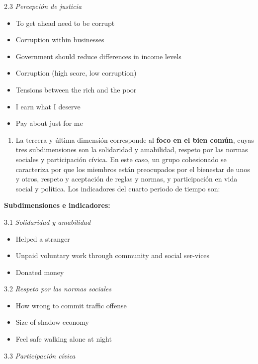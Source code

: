 \documentclass[
  12pt,
]{book}
\providecommand{\tightlist}{%
  \setlength{\itemsep}{0pt}\setlength{\parskip}{0pt}}
\begin{document}
2.3 \emph{Percepción de justicia}

\begin{itemize}
\tightlist
\item
  To get ahead need to be corrupt
\item
  Corruption within businesses
\item
  Government should reduce differences in income levels
\item
  Corruption (high score, low corruption)
\item
  Tensions between the rich and the poor
\item
  I earn what I deserve
\item
  Pay about just for me
\end{itemize}

\begin{enumerate}
\def\labelenumi{\arabic{enumi}.}
\setcounter{enumi}{2}
\tightlist
\item
  La tercera y última dimensión corresponde al \textbf{foco en el bien común}, cuyas tres subdimensiones son la solidaridad y amabilidad, respeto por las normas sociales y participación cívica. En este caso, un grupo cohesionado se caracteriza por que los miembros están preocupados por el bienestar de unos y otros, respeto y aceptación de reglas y normas, y participación en vida social y política. Los indicadores del cuarto periodo de tiempo son:
\end{enumerate}

\textbf{Subdimensiones e indicadores:}

3.1 \emph{Solidaridad y amabilidad}

\begin{itemize}
\tightlist
\item
  Helped a stranger
\item
  Unpaid voluntary work through community and social ser-vices
\item
  Donated money
\end{itemize}

3.2 \emph{Respeto por las normas sociales}

\begin{itemize}
\tightlist
\item
  How wrong to commit traffic offense
\item
  Size of shadow economy
\item
  Feel safe walking alone at night
\end{itemize}

3.3 \emph{Participación cívica}
\end{document}
